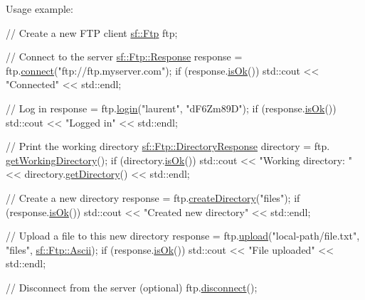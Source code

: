 Usage example\-: 
\begin{DoxyCode}
\textcolor{comment}{// Create a new FTP client}
\hyperlink{classsf_1_1Ftp}{sf::Ftp} ftp;

\textcolor{comment}{// Connect to the server}
\hyperlink{classsf_1_1Ftp_1_1Response}{sf::Ftp::Response} response = ftp.\hyperlink{classsf_1_1Ftp_af02fb3de3f450a50a27981961c69c860}{connect}(\textcolor{stringliteral}{"ftp://ftp.myserver.com"});
\textcolor{keywordflow}{if} (response.\hyperlink{classsf_1_1Ftp_1_1Response_a4dadbe0fe0a3ef2d571a017e1645e675}{isOk}())
    std::cout << \textcolor{stringliteral}{"Connected"} << std::endl;

\textcolor{comment}{// Log in}
response = ftp.\hyperlink{classsf_1_1Ftp_a686262bc377584cd50e52e1576aa3a9b}{login}(\textcolor{stringliteral}{"laurent"}, \textcolor{stringliteral}{"dF6Zm89D"});
\textcolor{keywordflow}{if} (response.\hyperlink{classsf_1_1Ftp_1_1Response_a4dadbe0fe0a3ef2d571a017e1645e675}{isOk}())
    std::cout << \textcolor{stringliteral}{"Logged in"} << std::endl;

\textcolor{comment}{// Print the working directory}
\hyperlink{classsf_1_1Ftp_1_1DirectoryResponse}{sf::Ftp::DirectoryResponse} directory = ftp.
      \hyperlink{classsf_1_1Ftp_a79c654fcdd0c81e68c4fa29af3b45e0c}{getWorkingDirectory}();
\textcolor{keywordflow}{if} (directory.\hyperlink{classsf_1_1Ftp_1_1Response_a4dadbe0fe0a3ef2d571a017e1645e675}{isOk}())
    std::cout << \textcolor{stringliteral}{"Working directory: "} << directory.\hyperlink{classsf_1_1Ftp_1_1DirectoryResponse_a500793778ad0ed223aa86ed8fbee28a3}{getDirectory}() << std::endl;

\textcolor{comment}{// Create a new directory}
response = ftp.\hyperlink{classsf_1_1Ftp_a247b84c4b25da37804218c2b748c4787}{createDirectory}(\textcolor{stringliteral}{"files"});
\textcolor{keywordflow}{if} (response.\hyperlink{classsf_1_1Ftp_1_1Response_a4dadbe0fe0a3ef2d571a017e1645e675}{isOk}())
    std::cout << \textcolor{stringliteral}{"Created new directory"} << std::endl;

\textcolor{comment}{// Upload a file to this new directory}
response = ftp.\hyperlink{classsf_1_1Ftp_a46d6e15cddd719288b5a08b685e11765}{upload}(\textcolor{stringliteral}{"local-path/file.txt"}, \textcolor{stringliteral}{"files"}, \hyperlink{classsf_1_1Ftp_a1cd6b89ad23253f6d97e6d4ca4d558cbac9e544a22dce8ef3177449cb235d15c2}{sf::Ftp::Ascii});
\textcolor{keywordflow}{if} (response.\hyperlink{classsf_1_1Ftp_1_1Response_a4dadbe0fe0a3ef2d571a017e1645e675}{isOk}())
    std::cout << \textcolor{stringliteral}{"File uploaded"} << std::endl;

\textcolor{comment}{// Disconnect from the server (optional)}
ftp.\hyperlink{classsf_1_1Ftp_acf7459926f3391cd06bf84337ed6a0f4}{disconnect}();
\end{DoxyCode}
 

